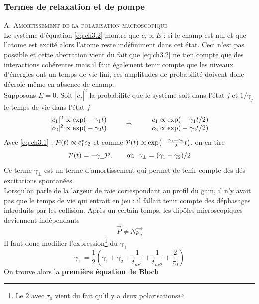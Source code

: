 \subsubsection{Termes de relaxation et de pompe}
\textsc{A. Amortissement de la polarisation macroscopique}\\
Le système d'équation \eqref{eq:ch3.2} montre que $c_i\propto E$ : si le champ est nul et que 
l'atome est excité alors l'atome reste indéfiniment dans cet état. Ceci n'est pas possible et 
cette aberration vient du fait que \eqref{eq:ch3.2} ne tien compte que des interactions 
cohérentes mais il faut également tenir compte que les niveaux d'énergies ont un temps de vie fini, 
ces amplitudes de probabilité doivent donc décroie même en absence de champ.\\

Supposons $E=0$. Soit $|c_j|^2$ la probabilité que le système soit dans l'état $j$ et 
$1/\gamma_j$ le temps de vie dans l'état $j$
\begin{equation}
\begin{array}{l}
|{c_1}{|^2} \propto {\rm{exp(}} - {\gamma _1}t{\rm{)}}\\
|{c_2}{|^2} \propto {\rm{exp(}} - {\gamma _2}t{\rm{)}}
\end{array}\qquad\Rightarrow\qquad\begin{array}{l}
{c_1} \propto {\rm{exp(}} - {\gamma _1}t/2{\rm{)}}\\
{c_2} \propto {\rm{exp(}} - {\gamma _2}t/2{\rm{)}}
\end{array}
\end{equation}
Avec \eqref{eq:ch3.1} : ${\cal P}(t) \propto c_1^*{c_2}$ et comme
${\cal P}(t) \propto \exp ( - \frac{{{\gamma _1} + {\gamma _2}}}{2}t)$, on en tire
\begin{equation}
\dot {\cal P}(t) =  - {\gamma _ \bot }{\cal P},\qquad \text{où }\ {\gamma _ \bot } = ({\gamma _1} + {\gamma _2})/2
\end{equation}
Ce terme $\gamma_\perp$ est un terme d'amortissement qui permet de tenir compte des dés-excitations 
spontanées.\\

Lorsqu'on parle de la largeur de raie correspondant au profil du gain, il n'y avait pas que le temps 
de vie qui entrait en jeu : il fallait tenir compte des déphasages introduits par les collision. 
Après un certain temps, les dipôles microscopiques deviennent indépendants
\begin{equation}
\vec{P} \neq N\vec{p_a}
\end{equation}
Il faut donc modifier l'expression\footnote{Le $2$ avec 
$\tau_0$ vient du fait qu'il y a deux polarisations} du $\gamma_\perp$
\begin{equation}
{\gamma _ \bot } = \frac{1}{2}\left({\gamma _1} + {\gamma _2} + \frac{1}{{{t_{nr1}}}} + \frac{1}{{{t_{nr2}}}} + \frac{2}{{{\tau _0}}}\right)
\end{equation}
On trouve alors la \textbf{première équation de Bloch}\\

